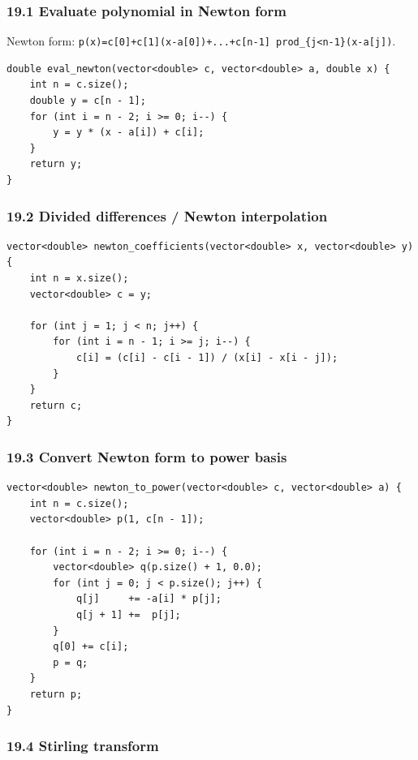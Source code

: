 \documentclass[11pt]{article}
\begin{document}
\subsubsection{19.1 Evaluate polynomial in Newton form}\label{evaluate-polynomial-in-newton-form}

Newton form: \texttt{p(x)=c[0]+c[1](x-a[0])+...+c[n-1] prod\_\{j<n-1\}(x-a[j])}.

\begin{verbatim}
double eval_newton(vector<double> c, vector<double> a, double x) {
    int n = c.size();
    double y = c[n - 1];
    for (int i = n - 2; i >= 0; i--) {
        y = y * (x - a[i]) + c[i];
    }
    return y;
}
\end{verbatim}

\subsubsection{19.2 Divided differences / Newton interpolation}\label{divided-differences-newton-interpolation}

\begin{verbatim}
vector<double> newton_coefficients(vector<double> x, vector<double> y) {
    int n = x.size();
    vector<double> c = y;

    for (int j = 1; j < n; j++) {
        for (int i = n - 1; i >= j; i--) {
            c[i] = (c[i] - c[i - 1]) / (x[i] - x[i - j]);
        }
    }
    return c;
}
\end{verbatim}

\subsubsection{19.3 Convert Newton form to power basis}\label{convert-newton-form-to-power-basis}

\begin{verbatim}
vector<double> newton_to_power(vector<double> c, vector<double> a) {
    int n = c.size();
    vector<double> p(1, c[n - 1]);

    for (int i = n - 2; i >= 0; i--) {
        vector<double> q(p.size() + 1, 0.0);
        for (int j = 0; j < p.size(); j++) {
            q[j]     += -a[i] * p[j];
            q[j + 1] +=  p[j];
        }
        q[0] += c[i];
        p = q;
    }
    return p;
}
\end{verbatim}

\subsubsection{19.4 Stirling transform}\label{stirling-transform}
\end{document}
